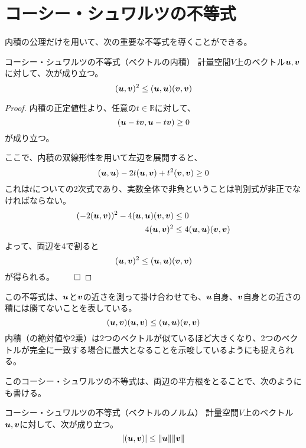 \documentclass[../../../topic_linear-algebra]{subfiles}
\begin{document}
\sectionline
\section{コーシー・シュワルツの不等式}

内積の公理だけを用いて、次の重要な不等式を導くことができる。

\begin{theorem*}{コーシー・シュワルツの不等式（ベクトルの内積）}
  計量空間$V$上のベクトル$\vb*{u}, \vb*{v}$に対して、次が成り立つ。
  \begin{equation*}
    (\vb*{u}, \vb*{v})^2 \leq (\vb*{u}, \vb*{u}) (\vb*{v}, \vb*{v})
  \end{equation*}
\end{theorem*}

\begin{proof}
  内積の正定値性より、任意の$t\in \mathbb{R}$に対して、
  \begin{equation*}
    (\vb*{u} - t\vb*{v}, \vb*{u} - t\vb*{v}) \geq 0
  \end{equation*}
  が成り立つ。

  ここで、内積の双線形性を用いて左辺を展開すると、
  \begin{equation*}
    (\vb*{u}, \vb*{u}) - 2t(\vb*{u}, \vb*{v}) + t^2(\vb*{v}, \vb*{v}) \geq 0
  \end{equation*}
  これは$t$についての2次式であり、実数全体で非負ということは判別式が非正でなければならない。
  \begin{align*}
    (-2(\vb*{u}, \vb*{v}))^2 - 4(\vb*{u}, \vb*{u})(\vb*{v}, \vb*{v}) & \leq 0                                     \\
    4(\vb*{u}, \vb*{v})^2                                            & \leq 4(\vb*{u}, \vb*{u})(\vb*{v}, \vb*{v})
  \end{align*}
  よって、両辺を4で割ると
  \begin{equation*}
    (\vb*{u}, \vb*{v})^2 \leq (\vb*{u}, \vb*{u})(\vb*{v}, \vb*{v})
  \end{equation*}
  が得られる。 $\qed$
\end{proof}

この不等式は、$\vb*{u}$と$\vb*{v}$の近さを測って掛け合わせても、$\vb*{u}$自身、$\vb*{v}$自身との近さの積には勝てないことを表している。
\begin{equation*}
  (\vb*{u}, \vb*{v})(\vb*{u}, \vb*{v}) \leq (\vb*{u}, \vb*{u})(\vb*{v}, \vb*{v})
\end{equation*}
内積（の絶対値や2乗）は2つのベクトルが似ているほど大きくなり、2つのベクトルが完全に一致する場合に最大となることを示唆しているようにも捉えられる。

\br

このコーシー・シュワルツの不等式は、両辺の平方根をとることで、次のようにも書ける。

\begin{theorem*}{コーシー・シュワルツの不等式（ベクトルのノルム）}
  計量空間$V$上のベクトル$\vb*{u}, \vb*{v}$に対して、次が成り立つ。
  \begin{equation*}
    |(\vb*{u}, \vb*{v})| \leq \|\vb*{u}\| \|\vb*{v}\|
  \end{equation*}
\end{theorem*}
\end{document}
